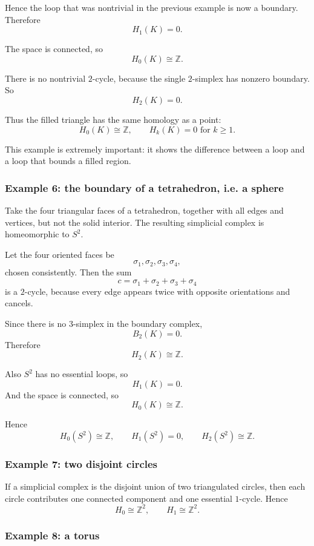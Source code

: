\documentclass[12pt,a4paper]{article}
\theoremstyle{notespace}
\begin{document}
Hence the loop that was nontrivial in the previous example is now a boundary. Therefore
\[
H_1(K)=0.
\]

The space is connected, so
\[
H_0(K)\cong \mathbb{Z}.
\]

There is no nontrivial \(2\)-cycle, because the single \(2\)-simplex has nonzero boundary. So
\[
H_2(K)=0.
\]

Thus the filled triangle has the same homology as a point:
\[
H_0(K)\cong \mathbb{Z},
\qquad
H_k(K)=0 \text{ for } k\ge 1.
\]

This example is extremely important: it shows the difference between a loop and a loop that bounds a filled region.

\subsubsection{Example 6: the boundary of a tetrahedron, i.e. a sphere}

Take the four triangular faces of a tetrahedron, together with all edges and vertices, but not the solid interior. The resulting simplicial complex is homeomorphic to \(S^2\).

Let the four oriented faces be
\[
\sigma_1,\sigma_2,\sigma_3,\sigma_4,
\]
chosen consistently. Then the sum
\[
c=\sigma_1+\sigma_2+\sigma_3+\sigma_4
\]
is a \(2\)-cycle, because every edge appears twice with opposite orientations and cancels.

Since there is no \(3\)-simplex in the boundary complex,
\[
B_2(K)=0.
\]
Therefore
\[
H_2(K)\cong \mathbb{Z}.
\]

Also \(S^2\) has no essential loops, so
\[
H_1(K)=0.
\]
And the space is connected, so
\[
H_0(K)\cong \mathbb{Z}.
\]

Hence
\[
H_0(S^2)\cong \mathbb{Z},\qquad
H_1(S^2)=0,\qquad
H_2(S^2)\cong \mathbb{Z}.
\]

\subsubsection{Example 7: two disjoint circles}

If a simplicial complex is the disjoint union of two triangulated circles, then each circle contributes one connected component and one essential \(1\)-cycle. Hence
\[
H_0\cong \mathbb{Z}^2,\qquad H_1\cong \mathbb{Z}^2.
\]

\subsubsection{Example 8: a torus}
\end{document}
